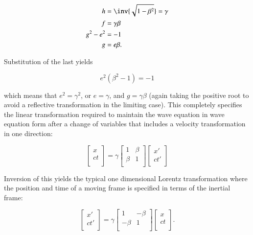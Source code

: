 \documentclass{article}      %
\begin{document}
\begin{align}
h &= \inv{\sqrt{1 - \beta^2}} = \gamma \\
f &= \gamma \beta \\
g^2 - e^2 &= -1 \\
g &= e \beta.
\end{align}

Substitution of the last yields

\[
e^2 (\beta^2 - 1) = -1
\]

which means that $e^2 = \gamma^2$, or $e = \gamma$, and $g = \gamma \beta$ (again taking the positive root to avoid a reflective transformation in the limiting case).  This completely specifies the linear
transformation required to maintain the wave equation in wave equation form after a change of variables that includes
a velocity transformation in one direction:

\begin{equation}
\begin{bmatrix}
x \\
ct \\
\end{bmatrix}
=
\gamma
\begin{bmatrix}
1 & \beta \\
\beta & 1 \\
\end{bmatrix}
\begin{bmatrix}
x' \\
c t' \\
\end{bmatrix}
\end{equation}

Inversion of this yields the typical one dimensional Lorentz transformation where the position and time of a moving
frame is specified in terms of the inertial frame:

\begin{equation}
\begin{bmatrix}
x' \\
ct' \\
\end{bmatrix}
=
\gamma
\begin{bmatrix}
1 & -\beta \\
-\beta & 1 \\
\end{bmatrix}
\begin{bmatrix}
x \\
c t \\
\end{bmatrix}.
\end{equation}
\end{document}
